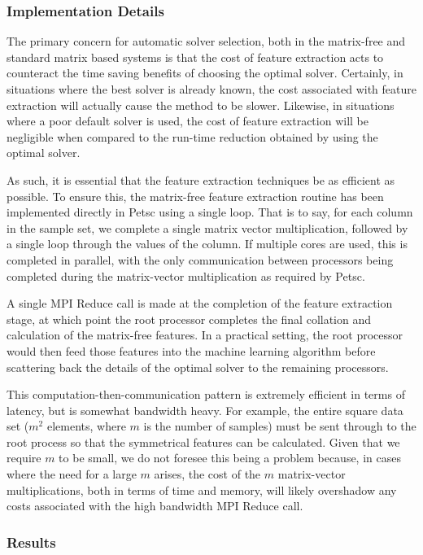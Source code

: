 \subsubsection{Implementation Details} 

The primary concern for automatic solver selection, both in the matrix-free and standard matrix based systems is that the cost of feature extraction acts to counteract the time saving benefits of choosing the optimal solver. Certainly, in situations where the best solver is already known, the cost associated with feature extraction will actually cause the method to be slower. Likewise, in situations where a poor default solver is used, the cost of feature extraction will be negligible when compared to the run-time reduction obtained by using the optimal solver. 

As such, it is essential that the feature extraction techniques be as efficient as possible. To ensure this, the matrix-free feature extraction routine has been implemented directly in Petsc using a single loop. That is to say, for each column in the sample set, we complete a single matrix vector multiplication, followed by a single loop through the values of the column. If multiple cores are used, this is completed in parallel, with the only communication between processors being completed during the matrix-vector multiplication as required by Petsc. 

A single MPI Reduce call is made at the completion of the feature extraction stage, at which point the root processor completes the final collation and calculation of the matrix-free features. In a practical setting, the root processor would then feed those features into the machine learning algorithm before scattering back the details of the optimal solver to the remaining processors. 

This computation-then-communication pattern is extremely efficient in terms of latency, but is somewhat bandwidth heavy. For example, the entire square data set ($m^2$ elements, where $m$ is the number of samples) must be sent through to the root process so that the symmetrical features can be calculated. Given that we require $m$ to be small, we do not foresee this being a problem because, in cases where the need for a large $m$ arises, the cost of the $m$ matrix-vector multiplications, both in terms of time and memory, will likely overshadow any costs associated with the high bandwidth MPI Reduce call.  

\subsubsection{Results}


